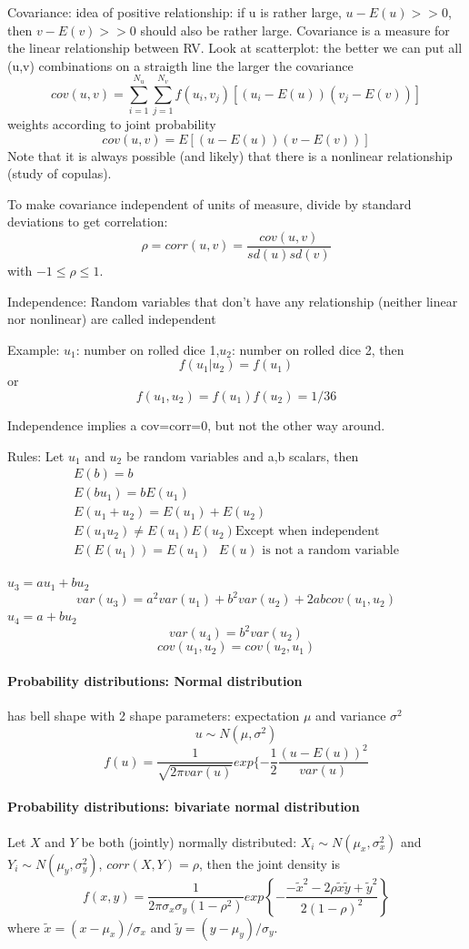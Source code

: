 \documentclass{article}
\begin{document}
Covariance: idea of positive relationship: if u is rather large, $u-E(u)>>0$, then $v-E(v)>>0$ should also be rather large.
Covariance is a measure for the linear relationship between RV. Look at scatterplot: the better we can put all (u,v) combinations on a straigth line the larger the covariance
$$cov(u,v) = \sum_{i=1}^{N_u}\sum_{j=1}^{N_v} f(u_i,v_j)[(u_i-E(u))(v_j-E(v))]$$
weights according to joint probability
$$cov(u,v) = E[(u-E(u))(v-E(v))]$$
Note that it is always possible (and likely) that there is a nonlinear relationship (study of copulas).

To make covariance independent of units of measure, divide by standard deviations to get correlation:
$$\rho = corr(u,v) = \frac{cov(u,v)}{sd(u)sd(v)}$$
with $-1\leq \rho \leq 1$.

Independence: Random variables that don't have any relationship (neither linear nor nonlinear) are called independent

Example: $u_1$: number on rolled dice 1,$u_2$: number on rolled dice 2, then 
$$f(u_1|u_2) = f(u_1)$$
or 
$$f(u_1,u_2) = f(u_1)f(u_2)=1/36$$

Independence implies a cov=corr=0, but not the other way around.

Rules: Let $u_1$ and $u_2$ be random variables and a,b scalars, then
\begin{align*}
E(b) = b\\
E(b u_1) = b E(u_1)\\
E(u_1+ u_2) = E(u_1) + E(u_2)\\
E(u_1 u_2) \neq E(u_1) E(u_2) \text{Except when independent}\\
E(E(u_1)) = E(u_1) \text{ $E(u)$ is not a random variable}
\end{align*}

$u_3 = a u_1 + b u_2$
$$var(u_3) = a^2 var(u_1) + b^2 var(u_2) + 2 ab cov(u_1,u_2)$$
$u_4 = a+b u_2$
$$var(u_4) = b^2var(u_2)$$
$$cov(u_1,u_2)=cov(u_2,u_1)$$

\paragraph{Probability distributions: Normal distribution}
has bell shape with 2 shape parameters: expectation $\mu$ and variance $\sigma^2$
$$u\sim N(\mu,\sigma^2)$$
$$f(u) = \frac{1}{\sqrt{2\pi var(u)}} exp\{-\frac{1}{2}\frac{(u-E(u))^2}{var(u)}$$


\paragraph{Probability distributions: bivariate normal distribution}
Let $X$ and $Y$ be both  (jointly) normally distributed: $X_i \sim N(\mu_x, \sigma^2_x)$ and $Y_i \sim N(\mu_y, \sigma^2_y)$, $corr(X,Y) = \rho$, then the joint density is
$$f(x,y)=\frac{1}{2\pi\sigma_x\sigma_y(1-\rho^2)}exp\left\{-\frac{-\tilde{x}^2-2\rho\tilde{x}\tilde{y}+\tilde{y}^2}{2(1-\rho)^2}\right\}$$ where $\tilde{x} = (x-\mu_x)/\sigma_x$ and $\tilde{y} = (y-\mu_y)/\sigma_y$.
\end{document}
